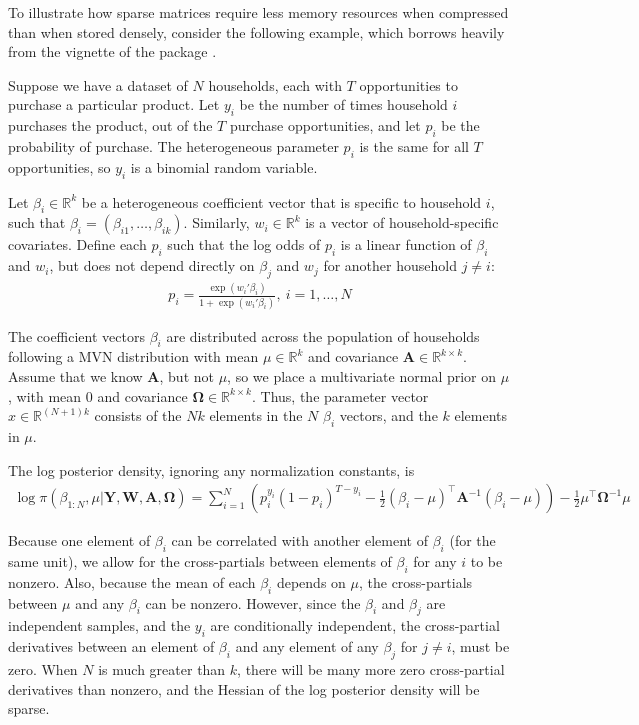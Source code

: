 \documentclass[codesnippet,nojss]{jss}\usepackage[]{graphicx}\usepackage[]{color}
\newcommand{\Real}[1]{\mathbb{R}^{#1}}
\newcommand{\Mat}[1]{\mathbf{#1}}
\begin{document}
To illustrate how sparse matrices require less memory resources when
compressed than when stored densely, consider the following example,
which borrows heavily from the vignette of the
 package \citep{R_sparseHessianFD}.

Suppose we have a dataset of $N$ households, each with $T$
 opportunities to purchase a particular product.  Let $y_i$ be the
 number of times household $i$ purchases the product, out of the $T$
 purchase opportunities, and let $p_i$ be the probability of
 purchase.  The heterogeneous parameter $p_i$ is the same for all $T$
 opportunities, so $y_i$ is a binomial random variable.

 Let $\beta_i\in\Real{k}$ be a heterogeneous coefficient vector that
 is specific to household $i$, such that
 $\beta_i=(\beta_{i1},\dotsc,\beta_{ik})$. Similarly,
 $w_i\in\Real{k}$ is a vector of household-specific covariates. Define each
 $p_i$ such that the log odds of $p_i$ is a linear function of
 $\beta_i$ and $w_i$, but does not depend directly on $\beta_j$ and $w_j$ for
 another household $j\neq i$:
\begin{align}
  p_i=\frac{\exp(w_i'\beta_i)}{1+\exp(w_i'\beta_i)},~i=1,\dots, N
\end{align}

The coefficient vectors $\beta_i$ are distributed across the population of households
following a MVN distribution with mean $\mu\in\Real{k}$ and
covariance $\Mat{A}\in\Real{k\times k}$.   Assume that we know
$\Mat{A}$, but not $\mu$, so we place a multivariate normal prior
on $\mu$, with mean $0$ and
covariance $\Mat{\Omega}\in\Real{k\times k}$.  Thus, the parameter
vector $x\in\Real{(N+1)k}$ consists of the $Nk$ elements in the $N$ $\beta_i$ vectors,
and the $k$ elements in $\mu$.

The log posterior density, ignoring any normalization constants, is
\begin{align}
  \label{eq:LPD}
  \log \pi(\beta_{1:N},\mu|\Mat{Y}, \Mat{W}, \Mat{A},\Mat{\Omega})=\sum_{i=1}^N\left(p_i^{y_i}(1-p_i)^{T-y_i}
  -\frac{1}{2}\left(\beta_i-\mu\right)^\top\Mat{A}^{-1}\left(\beta_i-\mu\right)\right)
-\frac{1}{2}\mu^\top\Mat{\Omega}^{-1}\mu
\end{align}

Because one element of $\beta_i$ can be correlated with another
element of $\beta_i$ (for the same unit), we allow for the
cross-partials between elements of $\beta_i$ for any $i$ to be
nonzero.  Also, because the mean of each $\beta_i$ depends on $\mu$,
the cross-partials between $\mu$ and any $\beta_i$ can be nonzero.
However, since the $\beta_i$ and $\beta_j$ are independent samples,
and the $y_i$ are
conditionally independent, the cross-partial derivatives between an
element of $\beta_i$ and any element of any $\beta_j$ for $j\neq i$,
must be zero.  When $N$ is much greater than $k$, there will be many
more zero cross-partial derivatives than nonzero, and the Hessian of
the log posterior density will be sparse.
\end{document}
